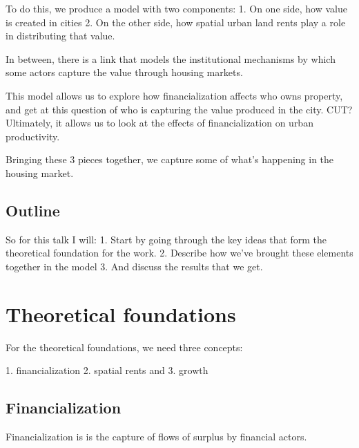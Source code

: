 \documentclass[]{article}
\begin{document}
To do this,  we produce a model with two components:
 1. On one side, how value is created in cities 
 2. On the other side, how spatial urban land rents play a role in distributing that value. 

In between, there is a link that models the institutional mechanisms by which some actors capture the value through housing markets.

This model allows us to explore how financialization affects who owns property, and get at this question of who is capturing the value produced in the city. CUT? Ultimately, it allows us to look at the effects of financialization on urban productivity.  

Bringing these 3 pieces together, we capture some of what's happening in the housing market.

\subsection{Outline}
So for this talk I will: 
1. Start by going through the key ideas that form the theoretical foundation for the work.
2. Describe how we've brought these elements together in the model 
3. And discuss the results that we get.

\section{Theoretical foundations}
For the theoretical foundations, we need three concepts: 

1. financialization
2. spatial rents and
3. growth

\subsection{Financialization}



Financialization is is the capture of flows of surplus by financial actors. 

\end{document}
